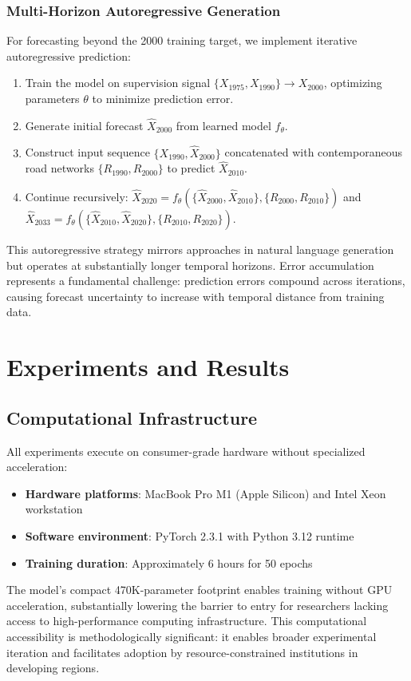 \documentclass[conference]{IEEEtran}
\begin{document}
\subsubsection{Multi-Horizon Autoregressive Generation}
For forecasting beyond the 2000 training target, we implement iterative autoregressive prediction:
\begin{enumerate}
    \item Train the model on supervision signal $\{X_{1975}, X_{1990}\} \rightarrow X_{2000}$, optimizing parameters $\theta$ to minimize prediction error.
    \item Generate initial forecast $\hat{X}_{2000}$ from learned model $f_\theta$.
    \item Construct input sequence $\{X_{1990}, \hat{X}_{2000}\}$ concatenated with contemporaneous road networks $\{R_{1990}, R_{2000}\}$ to predict $\hat{X}_{2010}$.
    \item Continue recursively: $\hat{X}_{2020} = f_\theta(\{\hat{X}_{2000}, \hat{X}_{2010}\}, \{R_{2000}, R_{2010}\})$ and $\hat{X}_{2033} = f_\theta(\{\hat{X}_{2010}, \hat{X}_{2020}\}, \{R_{2010}, R_{2020}\})$.
\end{enumerate}
This autoregressive strategy mirrors approaches in natural language generation but operates at substantially longer temporal horizons. Error accumulation represents a fundamental challenge: prediction errors compound across iterations, causing forecast uncertainty to increase with temporal distance from training data.

\section{Experiments and Results}

\subsection{Computational Infrastructure}
All experiments execute on consumer-grade hardware without specialized acceleration:
\begin{itemize}
    \item \textbf{Hardware platforms}: MacBook Pro M1 (Apple Silicon) and Intel Xeon workstation
    \item \textbf{Software environment}: PyTorch 2.3.1 with Python 3.12 runtime
    \item \textbf{Training duration}: Approximately 6 hours for 50 epochs
\end{itemize}
The model's compact 470K-parameter footprint enables training without GPU acceleration, substantially lowering the barrier to entry for researchers lacking access to high-performance computing infrastructure. This computational accessibility is methodologically significant: it enables broader experimental iteration and facilitates adoption by resource-constrained institutions in developing regions.
\end{document}
